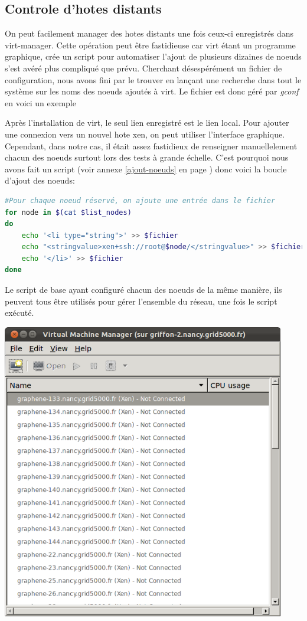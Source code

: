 \subsection{Controle d'hotes distants}
On peut facilement manager des hotes distants une fois ceux-ci enregistrés dans virt-manager. Cette opération peut être fastidieuse car virt étant un programme graphique, crée un script pour automatiser l'ajout de plusieurs dizaines de noeuds s'est avéré plus compliqué que prévu.
Cherchant désespérément un fichier de configuration, nous avons fini par le trouver en lançant une recherche dans tout le système sur les noms des noeuds ajoutés à virt. Le fichier est donc géré par \emph{gconf} en voici un exemple

Après l'installation de virt, le seul lien enregistré est le lien local. Pour ajouter une connexion vers un nouvel hote xen, on peut utiliser l'interface graphique.
Cependant, dans notre cas, il était assez fastidieux de renseigner manuellelement chacun des noeuds surtout lors des tests à grande échelle. C'est pourquoi nous avons fait un script (voir annexe \ref{ajout-noeuds} en page \pageref{ajout-noeuds}) donc voici la boucle d'ajout des noeuds:
\begin{lstlisting}[language=bash]
#Pour chaque noeud réservé, on ajoute une entrée dans le fichier
for node in $(cat $list_nodes)
do
    echo '<li type="string">' >> $fichier
    echo "<stringvalue>xen+ssh://root@$node/</stringvalue>" >> $fichier
    echo '</li>' >> $fichier
done
\end{lstlisting}
Le script de base ayant configuré chacun des noeuds de la même manière, ils peuvent tous être utilisés pour gérer l'ensemble du réseau, une fois le script exécuté.
\begin{center}
  \includegraphics[width=350pt]{images/virt-ajout_noeuds.png}
\end{center}
